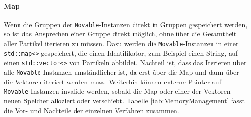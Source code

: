 \documentclass[11pt,a4paper]{article}
\begin{document}
\paragraph{Map}
Wenn die Gruppen der \lstinline!Movable!-Instanzen direkt in Gruppen gespeichert werden, so ist das Ansprechen einer Gruppe direkt möglich, ohne über die Gesamtheit aller Partikel iterieren zu müssen. Dazu werden die \lstinline!Movable!-Instanzen in einer \lstinline!std::map<>! gespeichert, die einen Identifikator, zum Beispiel einen String, auf einen \lstinline!std::vector<>! von Partikeln abbildet. Nachteil ist, dass das Iterieren über alle \lstinline!Movable!-Instanzen umständlicher ist, da erst über die Map und dann über die Vektoren iteriert werden muss. Weiterhin können externe Pointer auf \lstinline!Movable!-Instanzen invalide werden, sobald die Map oder einer der Vektoren neuen Speicher alloziert oder verschiebt. Tabelle \ref{tab:MemoryManagement} fasst die Vor- und Nachteile der einzelnen Verfahren zusammen.
\end{document}
